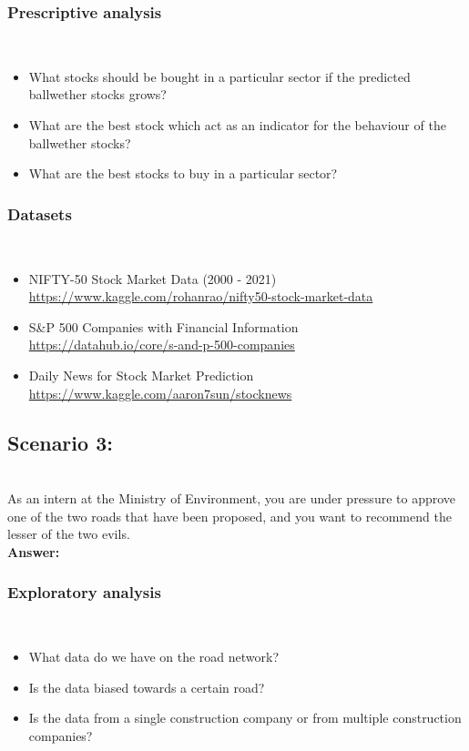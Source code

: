 \documentclass[12pt]{article}
\begin{document}
    \subsubsection*{Prescriptive analysis}\\
    \begin{itemize}
        \item What stocks should be bought in a particular sector if the predicted ballwether stocks grows?
        \item What are the best stock which act as an indicator for the behaviour of the ballwether stocks?
        \item What are the best stocks to buy in a particular sector?
    \end{itemize}
    
    \subsubsection*{Datasets}\\
    \begin{itemize}
        \item NIFTY-50 Stock Market Data (2000 - 2021)\\
        \url{https://www.kaggle.com/rohanrao/nifty50-stock-market-data}
        \item S&P 500 Companies with Financial Information\\
        \url{https://datahub.io/core/s-and-p-500-companies}
        \item Daily News for Stock Market Prediction\\
        \url{https://www.kaggle.com/aaron7sun/stocknews}
    \end{itemize}

    \subsection*{Scenario 3:}\\
    As an intern at the Ministry of Environment, you are under pressure to approve one of the two roads that have been proposed, and you want to recommend the lesser of the two evils.\\
    \textbf{Answer:}
    \subsubsection*{Exploratory analysis}\\
    \begin{itemize}
        \item What data do we have on the road network?
        \item Is the data biased towards a certain road?
        \item Is the data from a single construction company or from multiple construction companies?
    \end{itemize}
\end{document}
